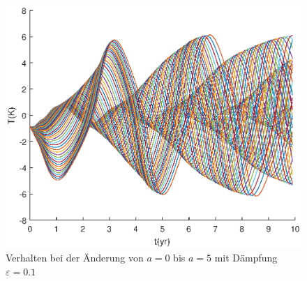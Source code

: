 \begin{figure}
	\centering
	\includegraphics{verzoegert/inp/figures/param_a_e01.eps}
	\caption{Verhalten bei der Änderung von $a=0$ bis $a=5$ mit Dämpfung $\varepsilon = 0.1$}
	\label{fig:chaos_fix}
\end{figure}
